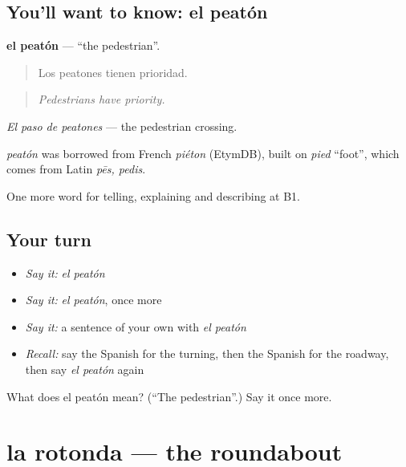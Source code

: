 \subsection*{You'll want to know: el peatón}
\textbf{el peatón} — \textquotedblleft{}the pedestrian\textquotedblright{}.

\begin{quote}
Los peatones tienen prioridad.
\end{quote}

\begin{quote}
\emph{Pedestrians have priority.}
\end{quote}

\emph{El paso de peatones} — the pedestrian crossing.

\begin{cousinweb}
\emph{peatón} was borrowed from French \emph{piéton} (EtymDB), built on \emph{pied} \textquotedblleft{}foot\textquotedblright{}, which comes from Latin \emph{pēs, pedis}.
\end{cousinweb}

\begin{grammarlens}[title={What you've built}]
One more word for telling, explaining and describing at B1.
\end{grammarlens}

\subsection*{Your turn}
\begin{itemize}
\raggedright
  \item \emph{Say it:} \emph{el peatón}
  \item \emph{Say it:} \emph{el peatón}, once more
  \item \emph{Say it:} a sentence of your own with \emph{el peatón}
  \item \emph{Recall:} say the Spanish for the turning, then the Spanish for the roadway, then say \emph{el peatón} again
\end{itemize}

\begin{tcolorbox}[breakable,colback=teal!4,colframe=teal!35!black,title={Before you move on}]
What does el peatón mean? (\textquotedblleft{}The pedestrian\textquotedblright{}.) Say it once more.
\end{tcolorbox}
\section[la rotonda]{la rotonda — the roundabout}

